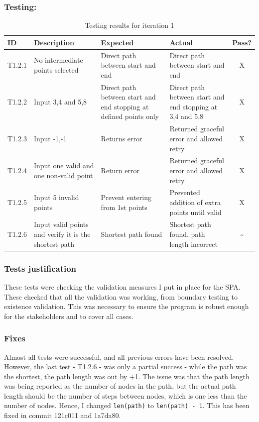 \newpage

\subsubsection{Testing:}
\begin{table}[htbp]
\centering
\begin{tabularx}{\textwidth}{|l|X|p{3.5cm}|p{3.5cm}|c|}
\hline
\textbf{ID} & \textbf{Description} & \textbf{Expected} & \textbf{Actual} & \textbf{Pass?} \\
\hline
T1.2.1 & No intermediate points selected & Direct path between start and end & Direct path between start and end & X \\
\hline
T1.2.2 & Input 3,4 and 5,8 & Direct path between start and end stopping at defined points only & Direct path between start and end stopping at 3,4 and 5,8 & X \\
\hline
T1.2.3 & Input -1,-1 & Returns error & Returned graceful error and allowed retry & X \\
\hline
T1.2.4 & Input one valid and one non-valid point & Return error & Returned graceful error and allowed retry & X \\
\hline
T1.2.5 & Input 5 invalid points & Prevent entering from 1st points & Prevented addition of extra points until valid & X \\
\hline
T1.2.6 & Input valid points and verify it is the shortest path & Shortest path found & Shortest path found, path length incorrect & \~{} \\
\hline

\end{tabularx}
\caption{Testing results for iteration 1}
\end{table}

\subsubsection{Tests justification}
These tests were checking the validation measures I put in place for the SPA. These checked that all the validation was working, from boundary testing to existence validation. This was necessary to ensure the program is robust enough for the stakeholders and to cover all cases.


\subsubsection{Fixes}
Almost all tests were successful, and all previous errors have been resolved. However, the last test - T1.2.6 - was only a partial success - while the path was the shortest, the path length was out by +1. The issue was that the path length was being reported as the number of nodes in the path, but the actual path length should be the number of steps between nodes, which is one less than the number of nodes. Hence, I changed \verb|len(path)| to \verb|len(path) - 1|. This has been fixed in commit 121c011 and 1a7da80.

